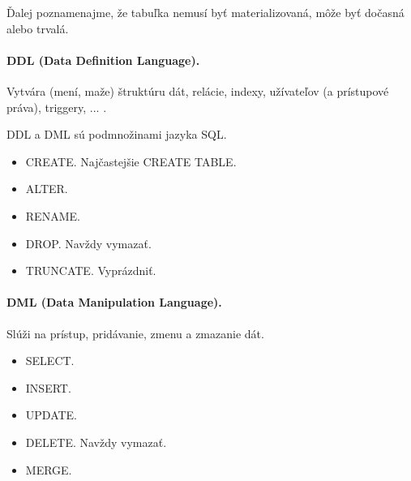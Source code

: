 \documentclass[10pt,a4paper]{article}
\begin{document}
Ďalej poznamenajme, že tabuľka nemusí byť materializovaná, môže byť dočasná alebo trvalá.

\paragraph{DDL (Data Definition Language).}
Vytvára (mení, maže) štruktúru dát, relácie, indexy, užívateľov (a prístupové práva), triggery, ... .

DDL a DML sú podmnožinami jazyka SQL.

\begin{itemize}
\item CREATE. Najčastejšie CREATE TABLE.
\item ALTER.
\item RENAME.
\item DROP. Navždy vymazať.
\item TRUNCATE. Vyprázdniť.
\end{itemize}

\paragraph{DML (Data Manipulation Language).}
Slúži na prístup, pridávanie, zmenu a zmazanie dát.

\begin{itemize}
\item SELECT.
\item INSERT.
\item UPDATE.
\item DELETE. Navždy vymazať.
\item MERGE.
\end{itemize}
\end{document}
